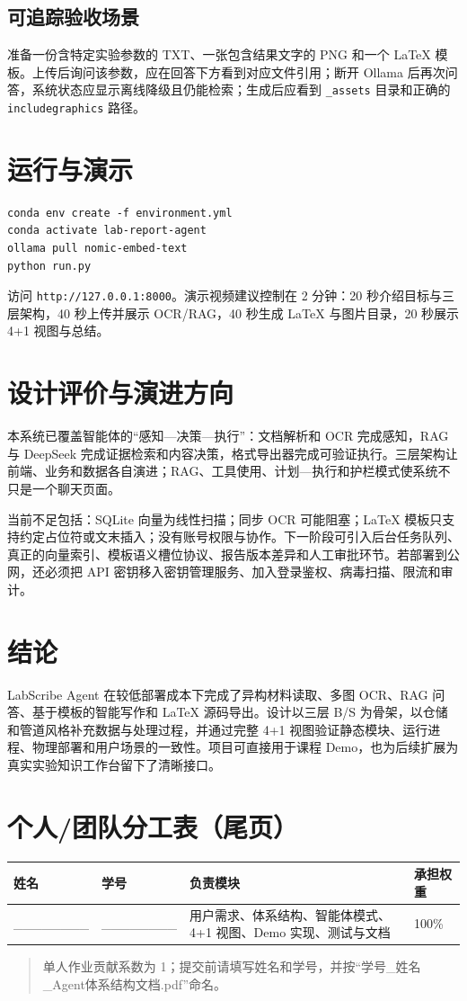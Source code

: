 \documentclass[12pt,a4paper]{ctexart}
\begin{document}
\subsection{可追踪验收场景}
准备一份含特定实验参数的 TXT、一张包含结果文字的 PNG 和一个 LaTeX 模板。上传后询问该参数，应在回答下方看到对应文件引用；断开 Ollama 后再次问答，系统状态应显示离线降级且仍能检索；生成后应看到 \texttt{\_assets} 目录和正确的 \texttt{includegraphics} 路径。

\section{运行与演示}
\begin{verbatim}
conda env create -f environment.yml
conda activate lab-report-agent
ollama pull nomic-embed-text
python run.py
\end{verbatim}
访问 \texttt{http://127.0.0.1:8000}。演示视频建议控制在 2 分钟：20 秒介绍目标与三层架构，40 秒上传并展示 OCR/RAG，40 秒生成 LaTeX 与图片目录，20 秒展示 4+1 视图与总结。

\section{设计评价与演进方向}
本系统已覆盖智能体的“感知—决策—执行”：文档解析和 OCR 完成感知，RAG 与 DeepSeek 完成证据检索和内容决策，格式导出器完成可验证执行。三层架构让前端、业务和数据各自演进；RAG、工具使用、计划—执行和护栏模式使系统不只是一个聊天页面。

当前不足包括：SQLite 向量为线性扫描；同步 OCR 可能阻塞；LaTeX 模板只支持约定占位符或文末插入；没有账号权限与协作。下一阶段可引入后台任务队列、真正的向量索引、模板语义槽位协议、报告版本差异和人工审批环节。若部署到公网，还必须把 API 密钥移入密钥管理服务、加入登录鉴权、病毒扫描、限流和审计。

\section{结论}
LabScribe Agent 在较低部署成本下完成了异构材料读取、多图 OCR、RAG 问答、基于模板的智能写作和 LaTeX 源码导出。设计以三层 B/S 为骨架，以仓储和管道风格补充数据与处理过程，并通过完整 4+1 视图验证静态模块、运行进程、物理部署和用户场景的一致性。项目可直接用于课程 Demo，也为后续扩展为真实实验知识工作台留下了清晰接口。

\appendix
\section{个人/团队分工表（尾页）}
\begin{table}[H]
\centering\small
\begin{tabularx}{\textwidth}{|X|X|X|X|}
\hline
\textbf{姓名} & \textbf{学号} & \textbf{负责模块} & \textbf{承担权重} \\ \hline
\_\_\_\_\_\_\_\_ & \_\_\_\_\_\_\_\_ & 用户需求、体系结构、智能体模式、4+1 视图、Demo 实现、测试与文档 & 100\% \\ \hline
\end{tabularx}
\end{table}
\begin{quote}\small 单人作业贡献系数为 1；提交前请填写姓名和学号，并按“学号\_姓名\_Agent体系结构文档.pdf”命名。\end{quote}
\end{document}
